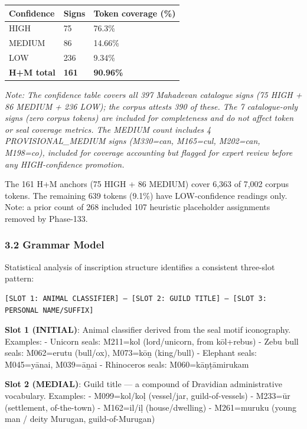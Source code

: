 \documentclass[
]{article}
\newcounter{none} %
\begin{document}
{\def\LTcaptype{none} %
\begin{longtable}[]{@{}lll@{}}
\toprule\noalign{}
Confidence & Signs & Token coverage (\%) \\
\midrule\noalign{}
\endhead
\bottomrule\noalign{}
\endlastfoot
HIGH & 75 & 76.3\% \\
MEDIUM & 86 & 14.66\% \\
LOW & 236 & 9.34\% \\
\textbf{H+M total} & \textbf{161} & \textbf{90.96\%} \\
\end{longtable}
}

\textit{Note: The confidence table covers all 397 Mahadevan catalogue signs (75 HIGH + 86 MEDIUM + 236 LOW); the corpus attests 390 of these. The 7 catalogue-only signs (zero corpus tokens) are included for completeness and do not affect token or seal coverage metrics. The MEDIUM count includes 4 PROVISIONAL\_MEDIUM signs (M330=\textit{can}, M165=\textit{cul}, M202=\textit{can}, M198=\textit{co}), included for coverage accounting but flagged for expert review before any HIGH-confidence promotion.}

The 161 H+M anchors (75 HIGH + 86 MEDIUM) cover 6,363 of 7,002 corpus tokens. The remaining 639 tokens (9.1\%) have LOW-confidence readings only. Note: a prior count of 268 included 107 heuristic placeholder assignments removed by Phase-133.

\subsubsection{3.2 Grammar Model}\label{grammar-model}

Statistical analysis of inscription structure identifies a consistent
three-slot pattern:

\begin{verbatim}
[SLOT 1: ANIMAL CLASSIFIER] – [SLOT 2: GUILD TITLE] – [SLOT 3: PERSONAL NAME/SUFFIX]
\end{verbatim}

\textbf{Slot 1 (INITIAL)}: Animal classifier derived from the seal motif
iconography. Examples: - Unicorn seals: M211=kol (lord/unicorn, from
kōl+rebus) - Zebu bull seals: M062=erutu (bull/ox), M073=kōṉ (king/bull)
- Elephant seals: M045=yānai, M039=āṉai - Rhinoceros seals:
M060=kāṇṭāmirukam

\textbf{Slot 2 (MEDIAL)}: Guild title --- a compound of Dravidian
administrative vocabulary. Examples: - M099=kol/koḷ (vessel/jar,
guild-of-vessels) - M233=ūr (settlement, of-the-town) - M162=il/iḷ
(house/dwelling) - M261=muruku (young man / deity Murugan,
guild-of-Murugan)
\end{document}
